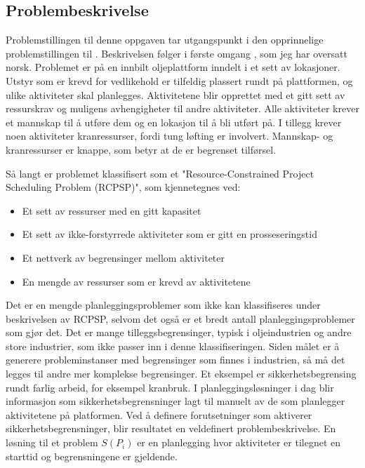 \subsection{Problembeskrivelse}
Problemstillingen til denne oppgaven tar utgangspunkt i den opprinnelige problemstillingen til \bht. Beskrivelsen følger i første omgang \cite{tvedtbezem}, som jeg har oversatt norsk. Problemet er på en innbilt oljeplattform inndelt i et sett av lokasjoner. Utstyr som er krevd for vedlikehold er tilfeldig plassert rundt på plattformen, og ulike aktiviteter skal planlegges. Aktivitetene blir opprettet med et gitt sett av ressurskrav og muligens avhengigheter til andre aktiviteter. Alle aktiviteter krever et mannskap til å utføre dem og en lokasjon til å bli utført på. I tillegg krever noen aktiviteter kranressurser, fordi tung løfting er involvert. Mannskap- og kranressurser er knappe, som betyr at de er begrenset tilførsel.

Så langt er problemet klassifisert som et "Resource-Constrained Project Scheduling Problem (RCPSP)"\cite{RcpspPaperSchutt}, som kjennetegnes ved:
\begin{itemize}
\item Et sett av ressurser med en gitt kapasitet
\item Et sett av ikke-forstyrrede aktiviteter som er gitt en prosseseringstid
\item Et nettverk av begrensinger mellom aktiviteter
\item En mengde av ressurser som er krevd av aktivitetene
\end{itemize}

Det er en mengde planleggingsproblemer som ikke kan klassifiseres under beskrivelsen av RCPSP, selvom det også er et bredt antall planleggingsproblemer som gjør det. Det er mange tilleggsbegrensinger, typisk i oljeindustrien og andre store industrier, som ikke passer inn i denne klassifiseringen. Siden målet er å generere probleminstanser med begrensinger som finnes i industrien, så må det legges til andre mer komplekse begrensinger. Et eksempel  er sikkerhetsbegrensing rundt farlig arbeid, for eksempel kranbruk. I planleggingsløsninger i dag blir informasjon som sikkerhetsbegrensninger lagt til manuelt av de som planlegger aktivitetene på platformen. Ved å definere forutsetninger som aktiverer sikkerhetsbegrensninger, blir resultatet en veldefinert problembeskrivelse. En løsning til et problem $ S(P_{i}) $ er en planlegging hvor aktiviteter er tilegnet en starttid og begrensningene er gjeldende.

